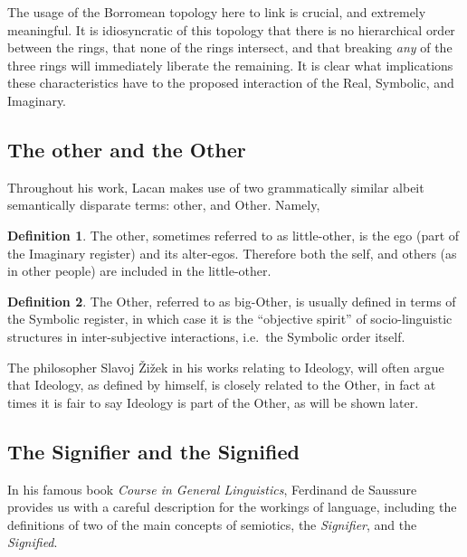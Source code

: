 \documentclass[11pt,letterpaper]{article}
\theoremstyle{definition}
\newtheorem{defn}{Definition}[section]
\begin{document}
The usage of the Borromean topology here to link is crucial, and extremely meaningful. It is idiosyncratic of this topology that there is no hierarchical order between the rings, that none of the rings intersect, and that breaking \emph{any} of the three rings will immediately liberate the remaining. It is clear what implications these characteristics have to the proposed interaction of the Real, Symbolic, and Imaginary.

\subsection{The other and the Other}

Throughout his work, Lacan makes use of two grammatically similar albeit semantically disparate terms: other, and Other. Namely,
\begin{defn}\label{def:little-other}
    The other, sometimes referred to as little-other, is the ego (part of the Imaginary register) and its alter-egos. Therefore both the self, and others (as in other people) are included in the little-other.\autocite{sep-lacan}
\end{defn}
\begin{defn}\label{def:big-other}
    The Other, referred to as big-Other, is usually defined in terms of the Symbolic register, in which case it is the ``objective spirit'' of socio-linguistic structures in inter-subjective interactions, i.e.\ the Symbolic order itself.\autocite{sep-lacan}
\end{defn}

The philosopher Slavoj Žižek in his works relating to Ideology, will often argue that Ideology, as defined by himself, is closely related to the Other, in fact at times it is fair to say Ideology is part of the Other, as will be shown later.
\newpage
\subsection{The Signifier and the Signified}
\begin{figure}
    \centering
\end{figure}
In his famous book \textit{Course in General Linguistics}\autocite{saussure_bally_sechehaye_urbain_riedlinger_2016}, Ferdinand de Saussure provides us with a careful description for the workings of language, including the definitions of two of the main concepts of semiotics, the \emph{Signifier}, and the \emph{Signified}.
\end{document}
